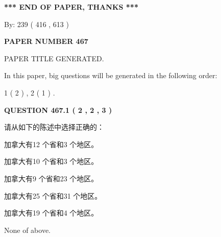 \documentclass{ctexart}
\begin{document}
   
   
   
\vspace{1.0in} 
{\textbf{\large{ *** END OF PAPER, THANKS *** }}} 
   
   
\hspace{1.0in} By: 
 239 ( 416 ,  613 )
   
   
   
   
\newpage 
\setcounter{page}{ 
   467001 } 
   
   
   
   
 {\textbf{ \Large{ PAPER NUMBER  467  }}}
   
   
\vspace{0.2in}
   
   
   
   
   
   
   
   
 \vspace{0.2in}
 
 
 
 
   
   
 PAPER TITLE GENERATED.
   
   
   
\vspace{0.2in}
   
In this paper, big questions will be generated in the following order: 
   
   
   1 ( 2 )
 ,
   2 ( 1 )
 .
  
\vspace{0.2in}
  
{\textbf{\Large{QUESTION
467.1 
 ( 2 , 2 , 3 )
}}}
  
  
请从如下的陈述中选择正确的：
 
 
加拿大有12 个省和3 个地区。
 
 
加拿大有10 个省和3 个地区。
 
 
加拿大有9 个省和23 个地区。
 
 
加拿大有25 个省和31 个地区。
 
 
加拿大有19 个省和4 个地区。
 
 
 None of above.
 
 
\noindent{}
 
\end{document}
